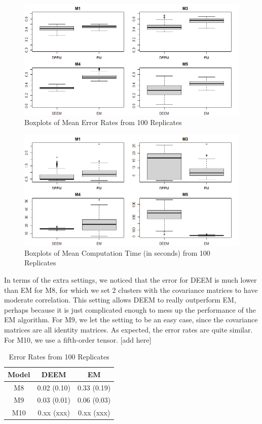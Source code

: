 \documentclass[11pt]{article}
\begin{document}
\begin{figure}[H]
    \centering
    \includegraphics[width = 16 cm]{sim_error.png}
    \caption{Boxplots of Mean Error Rates from 100 Replicates}
    \label{fig:err}
\end{figure}

\begin{figure}[H]
    \centering
    \includegraphics[width = 16 cm]{sim_time.png}
    \caption{Boxplots of Mean Computation Time (in seconds) from 100 Replicates}
    \label{fig:time}
\end{figure}

In terms of the extra settings, we noticed that the error for DEEM is much lower than EM for M8, for which we set $2$ clusters with the covariance matrices to have moderate correlation. This setting allows DEEM to really outperform EM, perhaps because it is just complicated enough to mess up the performance of the EM algorithm. For M9, we let the setting to be an easy case, since the covariance matrices are all identity matrices. As expected, the error rates are quite similar. For M10, we use a fifth-order tensor. [add here]

\begin{table}[H]
    \centering
    \begin{tabular}{|c|cc|}
    \hline
       Model  &  DEEM & EM \\
       \hline
         M8 & 0.02 (0.10) & 0.33 (0.19) \\
         M9 &  0.03 (0.01) & 0.06 (0.03) \\
         M10 &  0.xx (xxx) & 0.xx (xxx) \\ 
    \hline
    \end{tabular}
    \caption{Error Rates from 100 Replicates}
    \label{tab:err2}
\end{table}
\end{document}
